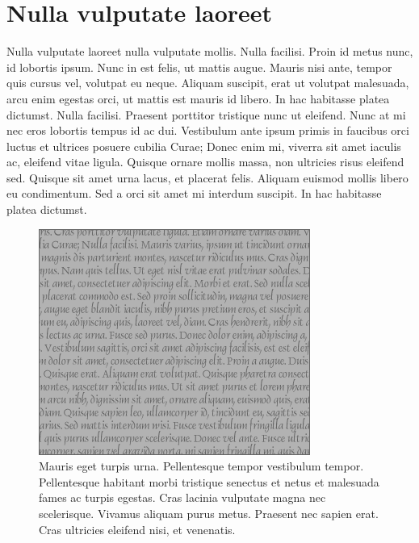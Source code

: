 \section{Nulla vulputate laoreet}
Nulla vulputate laoreet nulla vulputate mollis.
Nulla facilisi.
Proin id metus nunc, id lobortis ipsum.
Nunc in est felis, ut mattis augue.
Mauris nisi ante, tempor quis cursus vel, volutpat eu neque.
Aliquam suscipit, erat ut volutpat malesuada, arcu enim egestas orci, ut mattis est mauris id libero.
In hac habitasse platea dictumst.
Nulla facilisi.
Praesent porttitor tristique nunc ut eleifend.
Nunc at mi nec eros lobortis tempus id ac dui.
Vestibulum ante ipsum primis in faucibus orci luctus et ultrices posuere cubilia Curae; Donec enim mi, viverra sit amet iaculis ac, eleifend vitae ligula.
Quisque ornare mollis massa, non ultricies risus eleifend sed.
Quisque sit amet urna lacus, et placerat felis.
Aliquam euismod mollis libero eu condimentum.
Sed a orci sit amet mi interdum suscipit.
In hac habitasse platea dictumst.

\begin{figure}[!t]
  \centering
  \includegraphics{figs/large-rectangle-gray}
  \caption[Mauris eget turpis urna]{
    Mauris eget turpis urna.
Pellentesque tempor vestibulum tempor.
Pellentesque habitant morbi tristique senectus et netus et malesuada fames ac turpis egestas.
Cras lacinia vulputate magna nec scelerisque.
Vivamus aliquam purus metus.
Praesent nec sapien erat.
Cras ultricies eleifend nisi, et venenatis.
  }
\end{figure}

